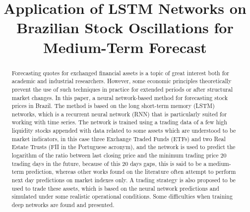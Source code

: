 \documentclass[conference]{IEEEtran}
\begin{document}
\title{Application of LSTM Networks on Brazilian Stock Oscillations for Medium-Term Forecast\\
}

\author{
}

\maketitle

\begin{abstract}
Forecasting quotes for exchanged financial assets is a topic of great interest both for academic and industrial researchers. However, some economic principles theoretically prevent the use of such techniques in practice for extended periods or after structural market changes. In this paper, a neural network-based method for forecasting stock prices in Brazil. The method is based on the long short-term memory (LSTM) networks, which is a recurrent neural network (RNN) that is particularly suited for working with time series. The network is trained using a trading data of a few high liquidity stocks appended with data related to some assets which are understood to be market indicators, in this case three Exchange Traded Funds (ETFs) and two Real Estate Trusts (FII in the Portuguese acronym), and the network is used to predict the logarithm of the ratio between last closing price and the minimum trading price 20 trading days in the future, because of this 20 days gaps, this is said to be a medium-term prediction, whereas other works found on the literature often attempt to perform next day predictions on market indexes only. A trading strategy is also proposed to be used to trade these assets, which is based on the neural network predictions and simulated under some realistic operational conditions. Some difficulties when training deep networks are found and presented.
\end{abstract}
\end{document}
